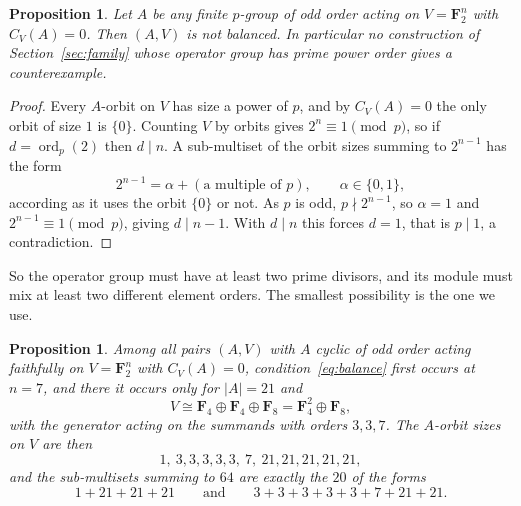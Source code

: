 \documentclass[11pt]{article}
\newtheorem{proposition}[theorem]{Proposition}
\theoremstyle{definition}
\theoremstyle{remark}
\newcommand{\F}{\mathbf F}
\begin{document}
\begin{proposition}\label{prop:prime-fails}
Let $A$ be any finite $p$-group of odd order acting on $V=\F_2^n$ with
$C_V(A)=0$.  Then $(A,V)$ is not balanced.  In particular no
construction of Section~\ref{sec:family} whose operator group has prime
power order gives a counterexample.
\end{proposition}

\begin{proof}
Every $A$-orbit on $V$ has size a power of $p$, and by
$C_V(A)=0$ the only orbit of size $1$ is $\{0\}$.  Counting $V$ by
orbits gives $2^n\equiv1\pmod p$, so if $d=\operatorname{ord}_p(2)$ then
$d\mid n$.  A sub-multiset of the orbit sizes summing to $2^{n-1}$ has
the form
\[
 2^{n-1}=\alpha+(\text{a multiple of }p),
 \qquad\alpha\in\{0,1\},
\]
according as it uses the orbit $\{0\}$ or not.  As $p$ is odd,
$p\nmid2^{n-1}$, so $\alpha=1$ and $2^{n-1}\equiv1\pmod p$, giving
$d\mid n-1$.  With $d\mid n$ this forces $d=1$, that is $p\mid1$, a
contradiction.
\end{proof}

So the operator group must have at least two prime divisors, and its
module must mix at least two different element orders.  The smallest
possibility is the one we use.

\begin{proposition}\label{prop:minimal}
Among all pairs $(A,V)$ with $A$ \emph{cyclic} of odd order acting
faithfully on $V=\F_2^n$ with $C_V(A)=0$, condition~\eqref{eq:balance}
first
occurs at $n=7$, and there it occurs only for $|A|=21$ and
\[
 V\cong\F_4\oplus\F_4\oplus\F_8=\F_4^2\oplus\F_8 ,
\]
with the generator acting on the summands with orders $3,3,7$.  The
$A$-orbit sizes on $V$ are then
\[
 1,\ 3,3,3,3,3,\ 7,\ 21,21,21,21,21,
\]
and the sub-multisets summing to $64$ are exactly the $20$ of the forms
\[
 1+21+21+21
 \qquad\text{and}\qquad
 3+3+3+3+3+7+21+21 .
\]
\end{proposition}
\end{document}
